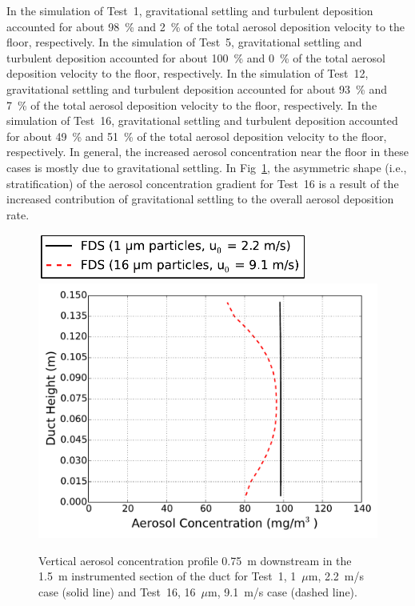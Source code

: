 In the simulation of Test~1, gravitational settling and turbulent deposition accounted for about 98~\% and 2~\% of the total aerosol deposition velocity to the floor, respectively. In the simulation of Test~5, gravitational settling and turbulent deposition accounted for about 100~\% and 0~\% of the total aerosol deposition velocity to the floor, respectively. In the simulation of Test~12, gravitational settling and turbulent deposition accounted for about 93~\% and 7~\% of the total aerosol deposition velocity to the floor, respectively. In the simulation of Test~16, gravitational settling and turbulent deposition accounted for about 49~\% and 51~\% of the total aerosol deposition velocity to the floor, respectively. In general, the increased aerosol concentration near the floor in these cases is mostly due to gravitational settling. In Fig~\ref{fig:Sippola_Transverse_Concentration}, the asymmetric shape (i.e., stratification) of the aerosol concentration gradient for Test~16 is a result of the increased contribution of gravitational settling to the overall aerosol deposition rate.

\begin{figure}[!ht]
\includegraphics[width=3.5in]{Fig_Sippola_Aerosol_Deposition_Transverse_Legend.pdf}
\includegraphics[width=5.0in]{Fig_Sippola_Aerosol_Deposition_Transverse_Concentration.pdf}
\caption[Vertical aerosol concentration profile]
{Vertical aerosol concentration profile 0.75~m downstream in the 1.5~m instrumented section of the duct for Test~1, 1~$\mu$m, 2.2~m/s case (solid line) and Test~16, 16~$\mu$m, 9.1~m/s case (dashed line).}
\label{fig:Sippola_Transverse_Concentration}
\end{figure}

